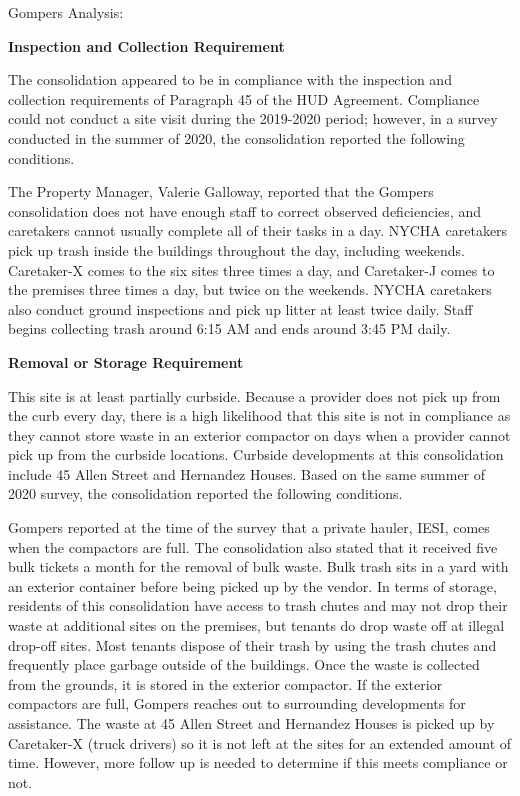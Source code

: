 Gompers Analysis: 

\textbf{Inspection and Collection Requirement} 

 

The consolidation appeared to be in compliance with the inspection and collection requirements of Paragraph 45 of the HUD Agreement. Compliance could not conduct a site visit during the 2019-2020 period; however, in a survey conducted in the summer of 2020, the consolidation reported the following conditions. 

The Property Manager, Valerie Galloway, reported that the Gompers consolidation does not have enough staff to correct observed deficiencies, and caretakers cannot usually complete all of their tasks in a day. NYCHA caretakers pick up trash inside the buildings throughout the day, including weekends. Caretaker-X comes to the six sites three times a day, and Caretaker-J comes to the premises three times a day, but twice on the weekends. NYCHA caretakers also conduct ground inspections and pick up litter at least twice daily. Staff begins collecting trash around 6:15 AM and ends around 3:45 PM daily.

\textbf{Removal or Storage Requirement} 

  

This site is at least partially curbside. Because a provider does not pick up from the curb every day, there is a high likelihood that this site is not in compliance as they cannot store waste in an exterior compactor on days when a provider cannot pick up from the curbside locations. Curbside developments at this consolidation include 45 Allen Street and Hernandez Houses. Based on the same summer of  2020 survey, the consolidation reported the following conditions.

 

Gompers reported at the time of the survey that a private hauler, IESI, comes when the compactors are full. The consolidation also stated that it received five bulk tickets a month for the removal of bulk waste. Bulk trash sits in a yard with an exterior container before being picked up by the vendor.  In terms of storage, residents of this consolidation have access to trash chutes and may not drop their waste at additional sites on the premises, but tenants do drop waste off at illegal drop-off sites.  Most tenants dispose of their trash by using the trash chutes and frequently place garbage outside of the buildings. Once the waste is collected from the grounds, it is stored in the exterior compactor. If the exterior compactors are full, Gompers reaches out to surrounding developments for assistance. The waste at 45 Allen Street and Hernandez Houses is picked up by Caretaker-X (truck drivers) so it is not left at the sites for an extended amount of time. However, more follow up is needed to determine if this meets compliance or not. 

